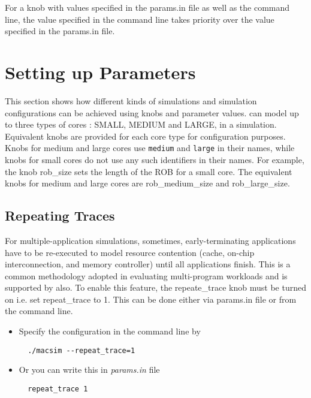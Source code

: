 For a knob with values specified in the params.in file as well as the command
line, the value specified in the command line takes priority over the value
specified in the params.in file.


\section{Setting up Parameters}
\label{sec:parameter}

This section shows how different kinds of simulations and simulation
configurations can be achieved using knobs and parameter values. \SIM can model up
to three types of cores : SMALL, MEDIUM and LARGE, in a simulation. Equivalent
knobs are provided for each core type for configuration purposes. Knobs for
medium and large cores use \Verb+medium+ and \Verb+large+ in their names, while
knobs for small cores do not use any such identifiers in their names. For
example, the knob rob\_size sets the length of the ROB for a small core. The
equivalent knobs for medium and large cores are rob\_medium\_size and
rob\_large\_size.


\subsection{Repeating Traces}

For multiple-application simulations, sometimes, early-terminating applications
have to be re-executed to model resource contention (cache, on-chip
    interconnection, and memory controller) until all applications finish. This
is a common methodology adopted in evaluating multi-program workloads and is
supported by \SIM also. To enable this feature, the repeate\_trace knob must be
turned on i.e. set repeat\_trace to 1. This can be done either via params.in
file or from the command line. 

\ignore
{

\begin{itemize}
  \item Specify the configuration in the command line by
  \begin{Verbatim}
  ./macsim --repeat_trace=1
  \end{Verbatim}

  \item Or you can write this in \textit{params.in} file
  \begin{Verbatim}
  repeat_trace 1
  \end{Verbatim}
\end{itemize}
}



